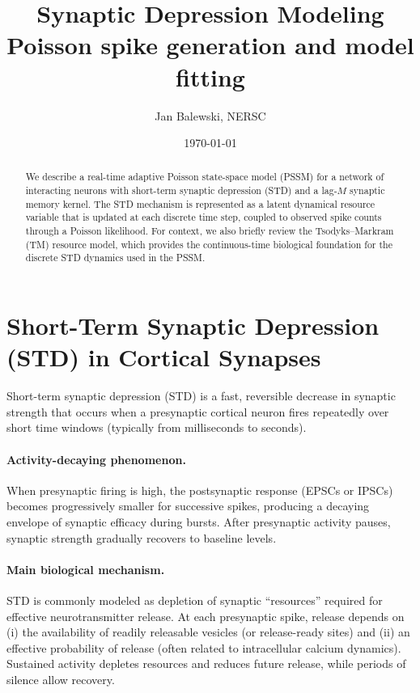 \documentclass[11pt]{article}
\title{Synaptic Depression Modeling \\ Poisson spike generation and model fitting}
\author{Jan Balewski, NERSC}
\date{\today}
\begin{document}
\maketitle

\begin{abstract}
We describe a real-time adaptive Poisson state-space model (PSSM) for a network of
interacting neurons with short-term synaptic depression (STD) and a lag-$M$ synaptic
memory kernel. The STD mechanism is represented as a latent dynamical resource variable
that is updated at each discrete time step, coupled to observed spike counts
through a Poisson likelihood. For context, we also briefly review the Tsodyks--Markram
(TM) resource model, which provides the continuous-time biological foundation for the
discrete STD dynamics used in the PSSM.
\end{abstract}

\section{Short-Term Synaptic Depression (STD) in Cortical Synapses}
\label{sec:std_intro}

Short-term synaptic depression (STD) is a fast, reversible decrease in synaptic strength
that occurs when a presynaptic cortical neuron fires repeatedly over short time windows
(typically from milliseconds to seconds).

\paragraph{Activity-decaying phenomenon.}
When presynaptic firing is high, the postsynaptic response (EPSCs or IPSCs) becomes
progressively smaller for successive spikes, producing a decaying envelope of synaptic
efficacy during bursts. After presynaptic activity pauses, synaptic strength gradually
recovers to baseline levels.

\paragraph{Main biological mechanism.}
STD is commonly modeled as depletion of synaptic ``resources'' required for effective
neurotransmitter release. At each presynaptic spike, release depends on
(i) the availability of readily releasable vesicles (or release-ready sites) and
(ii) an effective probability of release (often related to intracellular calcium dynamics).
Sustained activity depletes resources and reduces future release, while periods of silence
allow recovery.
\end{document}
